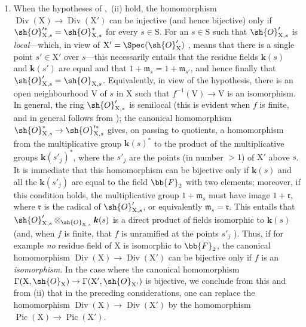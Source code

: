 \begin{remark}[21.8.6]
\begin{enumerate}[label=(\roman*)]
  \item When the hypotheses of ,{}~(ii) hold, the homomorphism $\operatorname{Div}(\mathrm{X})\to\operatorname{Div}(\mathrm{X}')$ can be injective (and hence bijective) only if $\sh{O}'^{*}_{\mathrm{X},s}=\sh{O}^*_{\mathrm{X},s}$ for every $s\in\mathrm{S}$.
For an $s\in\mathrm{S}$ such that $\sh{O}'_{\mathrm{X},s}$ is \emph{local}---which, in view of $\mathrm{X}'=\Spec(\sh{O}'_\mathrm{X})$ , means that there is a single point $s'\in\mathrm{X}'$ over $s$---this necessarily entails that the residue fields $\boldsymbol{k}(s)$ and $\boldsymbol{k}(s')$ are equal and that $1+\mathfrak{m}_s=1+\mathfrak{m}_{s'}$, and hence finally that $\sh{O}'_{\mathrm{X},s}=\sh{O}_{\mathrm{X},s}$.
Equivalently, in view of the hypothesis, there is an open neighbourhood $\mathrm{V}$ of $s$ in $\mathrm{X}$ such that $f^{-1}(\mathrm{V})\to\mathrm{V}$ is an isomorphism.
In general, the ring $\sh{O}'_{\mathrm{X},s}$ is semilocal (this is evident when $f$ is finite, and in general follows from ); the canonical homomorphism $\sh{O}^{*}_{\mathrm{X},s}\to\sh{O}'^{*}_{\mathrm{X},s}$ gives, on passing to quotients, a homomorphism from the multiplicative group $\boldsymbol{k}(s)^*$ to the product of the multiplicative groups $\boldsymbol{k}(s'_j)^*$, where the $s'_j$ are the points (in
  number $>1$) of $\mathrm{X}'$ above $s$.
It is immediate that this homomorphism can be bijective only if $\boldsymbol{k}(s)$ and all the $\boldsymbol{k}(s'_j)$ are equal to the field $\bb{F}_2$ with two elements;
moreover, if this condition holds, the multiplicative group $1+\mathfrak{m}_s$ must have image $1+\mathfrak{r}$, where $\mathfrak{r}$ is the radical of $\sh{O}'_{\mathrm{X},s}$, or equivalently $\mathfrak{m}_s=\mathfrak{r}$.
This entails that $\sh{O}'_{\mathrm{X},s}\otimes_{\sh{O}_{\mathrm{X},s}}\boldsymbol{k}(s)$ is a direct product of fields isomorphic to $\boldsymbol{k}(s)$ (and, when $f$ is finite, that $f$ is unramified at the points $s'_j$ ).
Thus, if for example \emph{no} residue field of $\mathrm{X}$ is isomorphic to $\bb{F}_2$, the canonical homomorphism $\operatorname{Div}(\mathrm{X})\to\operatorname{Div}(\mathrm{X}')$ can be bijective only if $f$ is an \emph{isomorphism}.
In the case where the canonical homomorphism $\Gamma(\mathrm{X},\sh{O}_\mathrm{X})\to\Gamma(\mathrm{X}',\sh{O}_{\mathrm{X}'})$ is bijective, we conclude from this and from (ii) that in the preceding considerations, one can replace the homomorphism $\operatorname{Div}(\mathrm{X})\to\operatorname{Div}(\mathrm{X}')$ by the homomorphism $\operatorname{Pic}(\mathrm{X})\to\operatorname{Pic}(\mathrm{X}')$.
\end{enumerate}
\end{remark}


